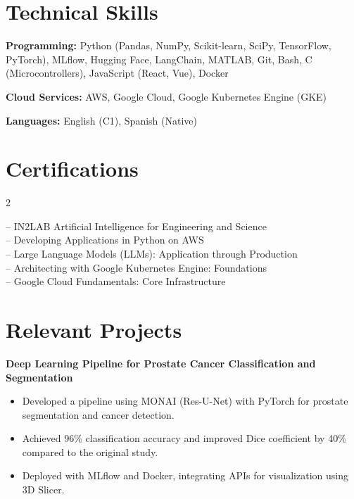 \documentclass[10pt,a4paper]{article}
\begin{document}
\section*{Technical Skills}

\textbf{Programming:} Python (Pandas, NumPy, Scikit-learn, SciPy, TensorFlow, PyTorch), MLflow, Hugging Face, LangChain, MATLAB, Git, Bash, C (Microcontrollers), JavaScript (React, Vue), Docker

\textbf{Cloud Services:} AWS, Google Cloud, Google Kubernetes Engine (GKE)

\textbf{Languages:} English (C1), Spanish (Native)

\vspace{-10pt}
\section*{Certifications}

\begin{multicols}{2}
\raggedright
-- IN2LAB Artificial Intelligence for Engineering and Science\\
-- Developing Applications in Python on AWS\\
-- Large Language Models (LLMs): Application through Production\\
-- Architecting with Google Kubernetes Engine: Foundations\\
-- Google Cloud Fundamentals: Core Infrastructure\\
\end{multicols}
\vspace{-10pt}

\section*{Relevant Projects}

\textbf{Deep Learning Pipeline for Prostate Cancer Classification and Segmentation}
\begin{itemize}
    \item Developed a pipeline using MONAI (Res-U-Net) with PyTorch for prostate segmentation and cancer detection.
    \item Achieved 96\% classification accuracy and improved Dice coefficient by 40\% compared to the original study.
    \item Deployed with MLflow and Docker, integrating APIs for visualization using 3D Slicer.
\end{itemize}
\end{document}

